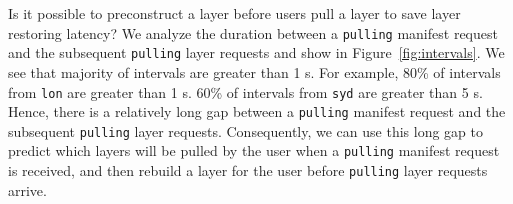 %
%
%
%
%
%

%
Is it possible to 
preconstruct a layer before users pull a layer to save layer restoring latency?
We analyze the duration between a \texttt{pulling} manifest request and the subsequent \texttt{pulling} layer requests
and show in Figure~\ref{fig:intervals}.
We see that 
majority of intervals are greater than 1 s.
For example, 80\% of intervals from \texttt{lon} are greater than 1 s.
60\% of intervals from \texttt{syd} are greater than 5 s.
Hence,
there is a relatively long gap between a \texttt{pulling} manifest request and the subsequent \texttt{pulling} layer requests.
Consequently,
we can use this long gap to predict which layers will be pulled by the user
when a \texttt{pulling} manifest request is received,
 and then 
rebuild a layer for the user before \texttt{pulling} layer requests arrive.


